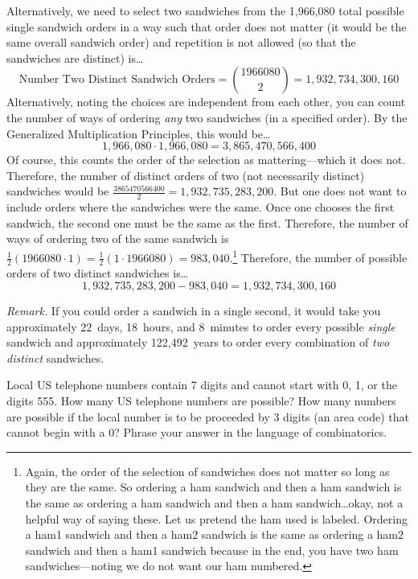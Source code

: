 \documentclass[11pt,letterpaper]{article}
\begin{document}
Alternatively, we need to select two sandwiches from the 1,966,080 total possible single sandwich orders in a way such that order does not matter (it would be the same overall sandwich order) and repetition is not allowed (so that the sandwiches are distinct) is\dots
	\[
	\text{Number Two Distinct Sandwich Orders}= \binom{1966080}{2}= 1,\!932,\!734,\!300,\!160
	\]
Alternatively, noting the choices are independent from each other, you can count the number of ways of ordering \textit{any} two sandwiches (in a specified order). By the Generalized Multiplication Principles, this would be\dots
	\[
	1,\!966,\!080 \cdot 1,\!966,\!080= 3,\!865,\!470,\!566,\!400
	\]
Of course, this counts the order of the selection as mattering---which it does not. Therefore, the number of distinct orders of two (not necessarily distinct) sandwiches would be $\frac{3865470566400}{2}= 1,\!932,\!735,\!283,\!200$. But one does not want to include orders where the sandwiches were the same. Once one chooses the first sandwich, the second one must be the same as the first. Therefore, the number of ways of ordering two of the same sandwich is $\frac{1}{2} (1966080 \cdot 1)= \frac{1}{2} (1 \cdot 1966080)= 983,\!040$.\footnote{Again, the order of the selection of sandwiches does not matter so long as they are the same. So ordering a ham sandwich and then a ham sandwich is the same as ordering a ham sandwich and then a ham sandwich\dots okay, not a helpful way of saying these. Let us pretend the ham used is labeled. Ordering a ham1 sandwich and then a ham2 sandwich is the same as ordering a ham2 sandwich and then a ham1 sandwich because in the end, you have two ham sandwiches---noting we do not want our ham numbered.} Therefore, the number of possible orders of two distinct sandwiches is\dots
	\[
	1,\!932,\!735,\!283,\!200 - 983,\!040= 1,\!932,\!734,\!300,\!160
	\]

{\itshape Remark.} If you could order a sandwich in a single second, it would take you approximately 22~days, 18~hours, and 8~minutes to order every possible \textit{single} sandwich and approximately 122,492~years to order every combination of \textit{two distinct} sandwiches. 



\newpage



 Local US telephone numbers contain 7 digits and cannot start with 0, 1, or the digits 555. How many US telephone numbers are possible? How many numbers are possible if the local number is to be proceeded by 3 digits (an area code) that cannot begin with a 0? Phrase your answer in the language of combinatorics. \pspace
\end{document}
